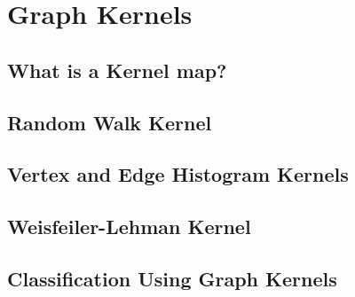\chapter{Graph Kernels}
\label{appendix:graph_kernels}



\section{What is a Kernel map?}
\label{appendix:graph_kernels:kernel}



\section{Random Walk Kernel}
\label{appendix:graph_kernels:random_walk}



\section{Vertex and Edge Histogram Kernels}
\label{appendix:graph_kernels:histogram}


\section{Weisfeiler-Lehman Kernel}
\label{appendix:graph_kernels:wl}


\section{Classification Using Graph Kernels}
\label{appendix:graph_kernels:classification}


